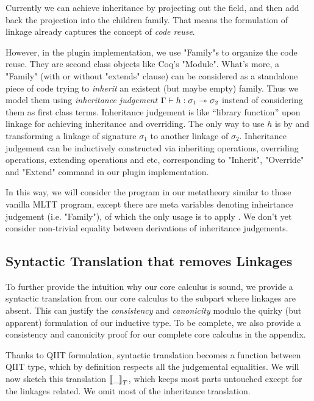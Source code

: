 Currently we can achieve inheritance by projecting out the field, and then add back the projection into the children family. That means the formulation of linkage already captures the concept of \textit{code reuse}. 

However, in the plugin implementation, we use "Family"s to organize the code reuse. They are second class objects like Coq's "Module". What's more, a "Family" (with or without "extends" clause) can be considered as a standalone piece of code trying to \textit{inherit} an existent (but maybe empty) family. Thus we model them using \textit{inheritance judgement} $ {\Gamma} \vdash {h} : {\sigma_1} \twoheadrightarrow {\sigma_2}$ instead of considering them as first class terms. Inheritance judgement is like ``library function'' upon linkage for achieving inheritance and overriding. The only way to use $h$ is by  and transforming a linkage of signature $\sigma_1$ to another linkage of $\sigma_2$. Inheritance judgement can be inductively constructed via inheriting operations, overriding operations, extending operations and etc, corresponding to "Inherit", "Override" and "Extend" command  in our plugin implementation.


In this way, we will consider the program in our metatheory similar to those vanilla MLTT program, except there are meta variables denoting inheirtance judgement (i.e. "Family"), of which the only usage is to apply . We don't yet consider non-trivial equality between derivations of inheritance judgements.


\subsection{Syntactic Translation that removes Linkages}
To further provide the intuition why our core calculus is sound, we provide a syntactic translation from our core calculus to the subpart where linkages are absent. This can justify the \textit{consistency} and \textit{canonicity} modulo the quirky (but apparent) formulation of our inductive type. To be complete, we also provide a consistency and canonicity proof for our complete core calculus in the appendix.

Thanks to QIIT formulation, syntactic translation becomes a function between QIIT type, which by definition respects all the judgemental equalities. We will now sketch this translation ${{\llbracket {\_} \rrbracket}_T}$, which keeps most parts untouched except for the linkages related. We omit most of the inheritance translation.



